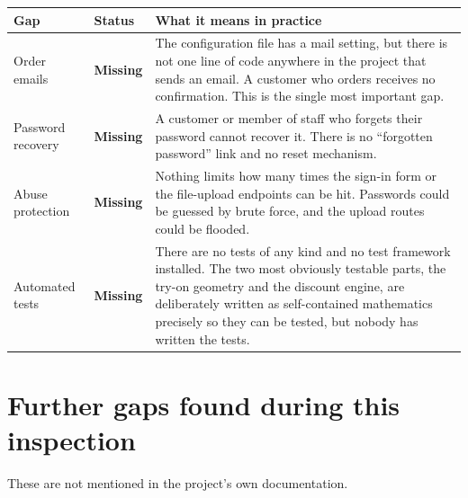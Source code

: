 \documentclass[11pt,a4paper]{report}
\newcommand{\absent}{\textcolor{vcred}{\textbf{Missing}}}
\begin{document}
\begin{longtable}{@{}p{}p{}p{}@{}}
\toprule
\textbf{Gap} & \textbf{Status} & \textbf{What it means in practice}\\
\midrule
\endhead
Order emails & \absent &
The configuration file has a mail setting, but there is not one line of code
anywhere in the project that sends an email. A customer who orders receives no
confirmation. This is the single most important gap.\\
\addlinespace
Password recovery & \absent &
A customer or member of staff who forgets their password cannot recover it.
There is no ``forgotten password'' link and no reset mechanism.\\
\addlinespace
Abuse protection & \absent &
Nothing limits how many times the sign-in form or the file-upload endpoints
can be hit. Passwords could be guessed by brute force, and the upload routes
could be flooded.\\
\addlinespace
Automated tests & \absent &
There are no tests of any kind and no test framework installed. The two most
obviously testable parts, the try-on geometry and the discount engine, are
deliberately written as self-contained mathematics precisely so they can be
tested, but nobody has written the tests.\\
\bottomrule
\end{longtable}

\section{Further gaps found during this inspection}

These are not mentioned in the project's own documentation.
\end{document}
